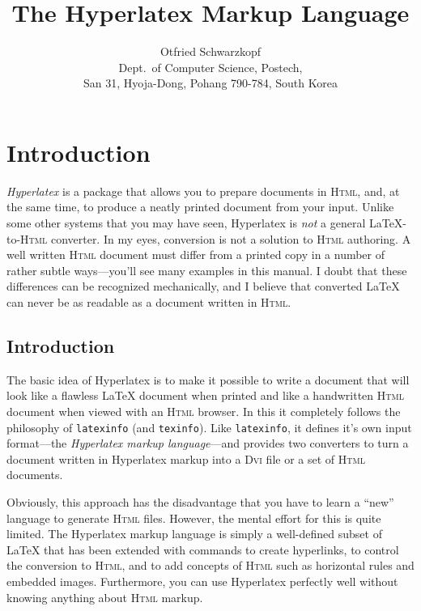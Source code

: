 \documentclass[a4paper]{article}
\title{The Hyperlatex Markup Language}
\author{Otfried Schwarzkopf\\
  {\footnotesize Dept.\ of Computer Science, Postech,}\\[-0.7ex]
  {\footnotesize San 31, Hyoja-Dong, Pohang 790-784, South Korea}}
\date{}
\newcommand{\+}{\verb+}
\renewcommand{\=}{\back{}}
\newcommand{\Html}{\textsc{Html}\xspace }
\newcommand{\latex}{\LaTeX\xspace }
\newcommand{\latexinfo}{\texttt{latexinfo}\xspace }
\newcommand{\texinfo}{\texttt{texinfo}\xspace }
\newcommand{\dvi}{\textsc{Dvi}\xspace }
\begin{document}
\maketitle
\section{Introduction}


\emph{Hyperlatex} is a package that allows you to prepare documents in
\Html, and, at the same time, to produce a neatly printed document
from your input. Unlike some other systems that you may have seen,
Hyperlatex is \emph{not} a general \latex-to-\Html converter.  In my
eyes, conversion is not a solution to \Html authoring.  A well written
\Html document must differ from a printed copy in a number of rather
subtle ways---you'll see many examples in this manual.  I doubt that
these differences can be recognized mechanically, and I believe that
converted \latex can never be as readable as a document written in
\Html. 


\begin{ifhtml}
  \section{Introduction}
\end{ifhtml}

The basic idea of Hyperlatex is to make it possible to write a
document that will look like a flawless \latex document when printed
and like a handwritten \Html document when viewed with an \Html
browser. In this it completely follows the philosophy of \latexinfo
(and \texinfo).  Like \latexinfo, it defines it's own input
format---the \emph{Hyperlatex markup language}---and provides two
converters to turn a document written in Hyperlatex markup into a \dvi
file or a set of \Html documents.

\label{philosophy}
Obviously, this approach has the disadvantage that you have to learn a
``new'' language to generate \Html files. However, the mental effort
for this is quite limited. The Hyperlatex markup language is simply a
well-defined subset of \latex that has been extended with commands to
create hyperlinks, to control the conversion to \Html, and to add
concepts of \Html such as horizontal rules and embedded images.
Furthermore, you can use Hyperlatex perfectly well without knowing
anything about \Html markup.
\end{document}
